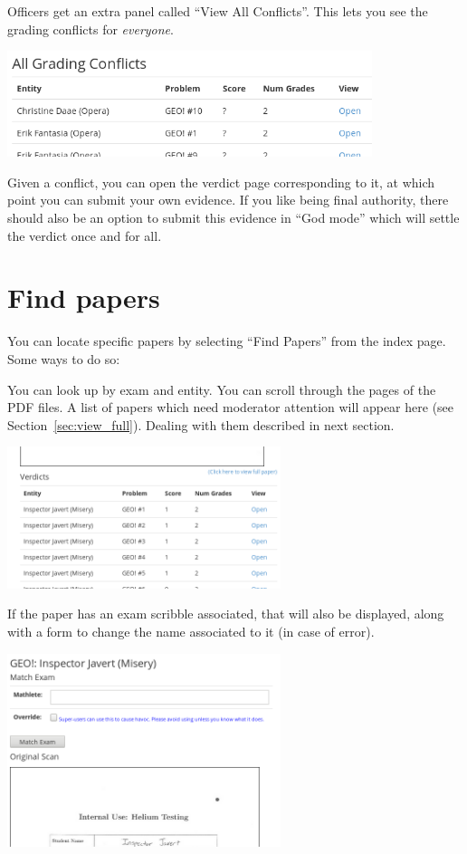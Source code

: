 Officers get an extra panel called ``View All Conflicts''.
This lets you see the grading conflicts for \emph{everyone}.

\begin{center}
	\includegraphics[width=0.8\textwidth]{images/all-conflict.png}
\end{center}

Given a conflict, you can open the verdict page corresponding to it,
at which point you can submit your own evidence.
If you like being final authority,
there should also be an option to submit this evidence in ``God mode''
which will settle the verdict once and for all.
\section{Find papers}
You can locate specific papers
by selecting ``Find Papers'' from the index page.
Some ways to do so:
\begin{itemize}
	\ii You can look up by exam and entity.
	\ii You can scroll through the pages of the PDF files.
	\ii A list of papers which need moderator attention
	will appear here (see Section~\ref{sec:view_full}).
	Dealing with them described in next section.
\end{itemize}

\begin{center}
	\includegraphics[width=0.6\textwidth]{images/viewpaper2.png}
\end{center}

If the paper has an exam scribble associated,
that will also be displayed,
along with a form to change the name associated to it
(in case of error).

\begin{center}
	\includegraphics[width=0.6\textwidth]{images/viewpaper1.png}
\end{center}

